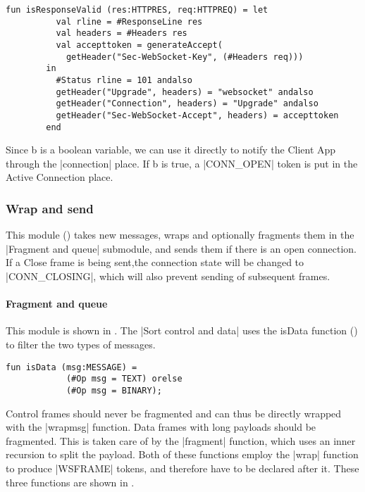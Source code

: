 		\begin{lstlisting}[label=lst:isResponseValid,caption=isResponseValid,gobble=2,float]
		fun isResponseValid (res:HTTPRES, req:HTTPREQ) = let
		  val rline = #ResponseLine res
		  val headers = #Headers res
		  val accepttoken = generateAccept(
		    getHeader("Sec-WebSocket-Key", (#Headers req)))
		in
		  #Status rline = 101 andalso
		  getHeader("Upgrade", headers) = "websocket" andalso
		  getHeader("Connection", headers) = "Upgrade" andalso
		  getHeader("Sec-WebSocket-Accept", headers) = accepttoken
		end
		\end{lstlisting}
		
		Since b is a boolean variable, we can use it directly to
		notify the Client App through the |connection| place. If b is true, a
		|CONN_OPEN| token is put in the Active Connection place.
		
	\subsubsection{Wrap and send}
		
		
		This module () takes new messages, wraps and optionally
		fragments them in the |Fragment and queue| submodule, and
		sends them if there is an open connection. If a Close frame is being sent,the
		connection state will be changed to |CONN_CLOSING|, which will also prevent
		sending of subsequent frames.
		
		\paragraph{Fragment and queue}
			
			
			This module is shown in . The 
			|Sort control and data| uses the isData function () to filter
			the two types of messages.
			
			\begin{lstlisting}[label=lst:isData,caption=isData,gobble=3,float=h]
			fun isData (msg:MESSAGE) =
			(#Op msg = TEXT) orelse
			(#Op msg = BINARY);
			\end{lstlisting}
			
			Control frames should never be fragmented and can thus be directly wrapped
			with the |wrapmsg| function.
			Data frames with long payloads should be fragmented. This is taken care of by
			the |fragment| function, which uses an inner recursion to split the payload. 
			Both of these functions employ the |wrap| function
			to produce |WSFRAME| tokens, and therefore have to be declared after it.
			These three functions are shown in .
			
